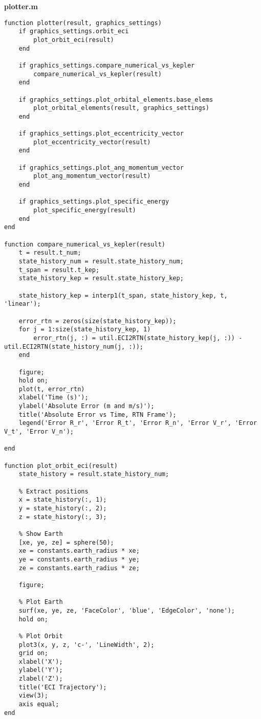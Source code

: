 \textbf{plotter.m}
\begin{lstlisting}
function plotter(result, graphics_settings)
    if graphics_settings.orbit_eci
        plot_orbit_eci(result)
    end

    if graphics_settings.compare_numerical_vs_kepler
        compare_numerical_vs_kepler(result)
    end

    if graphics_settings.plot_orbital_elements.base_elems
        plot_orbital_elements(result, graphics_settings)
    end

    if graphics_settings.plot_eccentricity_vector
        plot_eccentricity_vector(result)
    end

    if graphics_settings.plot_ang_momentum_vector
        plot_ang_momentum_vector(result)
    end

    if graphics_settings.plot_specific_energy
        plot_specific_energy(result)
    end
end

function compare_numerical_vs_kepler(result)
    t = result.t_num;
    state_history_num = result.state_history_num;
    t_span = result.t_kep;
    state_history_kep = result.state_history_kep;

    state_history_kep = interp1(t_span, state_history_kep, t, 'linear');

    error_rtn = zeros(size(state_history_kep));
    for j = 1:size(state_history_kep, 1)
        error_rtn(j, :) = util.ECI2RTN(state_history_kep(j, :)) - util.ECI2RTN(state_history_num(j, :));
    end
    
    figure;
    hold on;
    plot(t, error_rtn)
    xlabel('Time (s)');
    ylabel('Absolute Error (m and m/s)');
    title('Absolute Error vs Time, RTN Frame');
    legend('Error R_r', 'Error R_t', 'Error R_n', 'Error V_r', 'Error V_t', 'Error V_n');

end

function plot_orbit_eci(result)
    state_history = result.state_history_num;

    % Extract positions
    x = state_history(:, 1);
    y = state_history(:, 2);
    z = state_history(:, 3);

    % Show Earth
    [xe, ye, ze] = sphere(50);
    xe = constants.earth_radius * xe;
    ye = constants.earth_radius * ye;
    ze = constants.earth_radius * ze;

    figure;

    % Plot Earth
    surf(xe, ye, ze, 'FaceColor', 'blue', 'EdgeColor', 'none');
    hold on;

    % Plot Orbit
    plot3(x, y, z, 'c-', 'LineWidth', 2); 
    grid on;
    xlabel('X');
    ylabel('Y');
    zlabel('Z');
    title('ECI Trajectory');
    view(3);
    axis equal;
end


\end{lstlisting}
